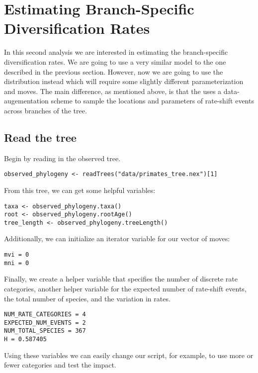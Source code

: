 







\bigskip
\section{Estimating Branch-Specific Diversification Rates}

In this second analysis we are interested in estimating the branch-specific diversification rates.
We are going to use a very similar model to the one described in the previous section.
However, now we are going to use the  distribution instead which will require some slightly different parameterization and moves.
The main difference, as mentioned above, is that the  uses a data-augementation scheme to sample the locations and parameters of rate-shift events across branches of the tree.

\subsection{Read the tree}

Begin by reading in the observed tree.

{\tt \begin{snugshade*}
\begin{lstlisting}
observed_phylogeny <- readTrees("data/primates_tree.nex")[1]
\end{lstlisting}
\end{snugshade*}}

From this tree, we can get some helpful variables:
{\tt \begin{snugshade*}
\begin{lstlisting}
taxa <- observed_phylogeny.taxa()
root <- observed_phylogeny.rootAge()
tree_length <- observed_phylogeny.treeLength()
\end{lstlisting}
\end{snugshade*}}

Additionally, we can initialize an iterator variable for our vector of moves:
{\tt \begin{snugshade*}
\begin{lstlisting}
mvi = 0
mni = 0
\end{lstlisting}
\end{snugshade*}}

Finally, we create a helper variable that specifies the number of discrete rate categories, another helper variable for the expected number of rate-shift events, the total number of species, and the variation in rates.
{\tt \begin{snugshade*}
\begin{lstlisting}
NUM_RATE_CATEGORIES = 4
EXPECTED_NUM_EVENTS = 2
NUM_TOTAL_SPECIES = 367
H = 0.587405
\end{lstlisting}
\end{snugshade*}}
Using these variables we can easily change our script, for example, to use more or fewer categories and test the impact.



